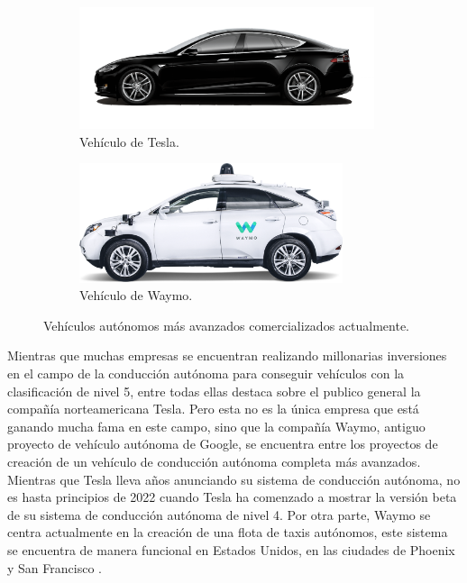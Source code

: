 \begin{figure}[H]
\centering
    \begin{subfigure}{0.45\textwidth}
    \centering
    \includegraphics[width=0.95\textwidth]{Book/figures/1_introduccion/tesla.png} 
    \caption{Vehículo de Tesla.}
    \label{fig:Vehículo de Tesla.}
    \end{subfigure}
    \begin{subfigure}{0.45\textwidth}
    \centering
    \includegraphics[width=0.85\textwidth]{Book/figures/1_introduccion/waymo.png}
    \caption{Vehículo de Waymo.}
    \label{fig:Vehículo de Waymo.}
    \end{subfigure}
\caption{Vehículos autónomos más avanzados comercializados actualmente.}
\label{fig:Vehículos autónomos más avanzados comercializados actualmente}
\end{figure}

Mientras que muchas empresas se encuentran realizando millonarias inversiones en el campo de la conducción autónoma para conseguir vehículos con la clasificación de nivel 5, entre todas ellas destaca sobre el publico general la compañía norteamericana Tesla. Pero esta no es la única empresa que está ganando mucha fama en este campo, sino que la compañía Waymo, antiguo proyecto de vehículo autónoma de Google, se encuentra entre los proyectos de creación de un vehículo de conducción autónoma completa más avanzados. Mientras que Tesla lleva años anunciando su sistema de conducción autónoma, no es hasta principios de 2022 cuando Tesla ha comenzado a mostrar la versión beta de su sistema de conducción autónoma de nivel 4. Por otra parte, Waymo se centra actualmente en la creación de una flota de taxis autónomos, este sistema se encuentra de manera funcional en Estados Unidos, en las ciudades de Phoenix y San Francisco \cite{tesla_waymo}.

